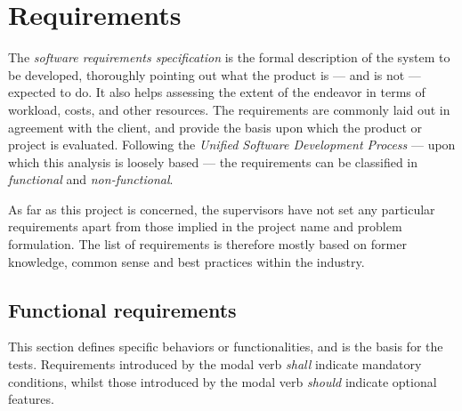 \section{Requirements}
The \emph{software requirements specification} is the formal description of the system to be developed, thoroughly pointing out what the product is --- and is not --- expected to do.
It also helps assessing the extent of the endeavor in terms of workload, costs, and other resources.
The requirements are commonly laid out in agreement with the client, and provide the basis upon which the product or project is evaluated.
Following the \emph{Unified Software Development Process} --- upon which this analysis is loosely based --- the requirements can be classified in \emph{functional} and \emph{non-functional}.

As far as this project is concerned, the supervisors have not set any particular requirements apart from those implied in the project name and problem formulation.
The list of requirements is therefore mostly based on former knowledge, common sense and best practices within the industry.


\subsection{Functional requirements}\label{subsec:req_func}
This section defines specific behaviors or functionalities, and is the basis for the tests.
Requirements introduced by the modal verb \emph{shall} indicate mandatory conditions, whilst those introduced by the modal verb \emph{should} indicate optional features.

